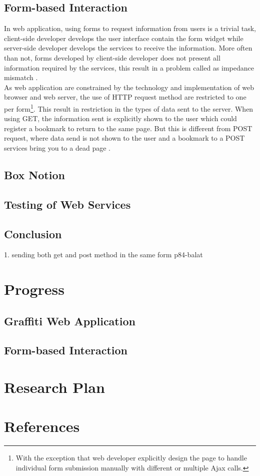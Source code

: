 \documentclass[12pt,fullpage]{article}
\begin{document}
\subsection{Form-based Interaction}
In web application, using forms to request information from users is a trivial
task, client-side developer develops the user interface contain the form widget
while server-side developer develops the services to receive the information.
More often than not, forms developed by client-side developer does not present
all information required by the services, this result in a problem called as
impedance mismatch \parencite{links-fmco06}.
\\
As web application are constrained by the technology and implementation of web
browser and web server, the use of HTTP request method are restricted to one per
form\footnote{With the exception that web developer explicitly design the
page to handle individual form submission manually with different or multiple
Ajax calls.}. This result in restriction in the types of data sent to the server.
When using GET, the information sent is explicitly shown to the user which could
register a bookmark to return to the same page. But this is different from POST
request, where data send is not shown to the user and a bookmark to a POST
services bring you to a dead page .

\subsection{Box Notion}


\subsection{Testing of Web Services}

\subsection{}
\subsection{Conclusion}
1. sending both get and post method in the same form p84-balat


\section{Progress}
\subsection{Graffiti Web Application}

\subsection{Form-based Interaction}
\section{Research Plan}
\section{References}
\printbibliography
\end{document}
